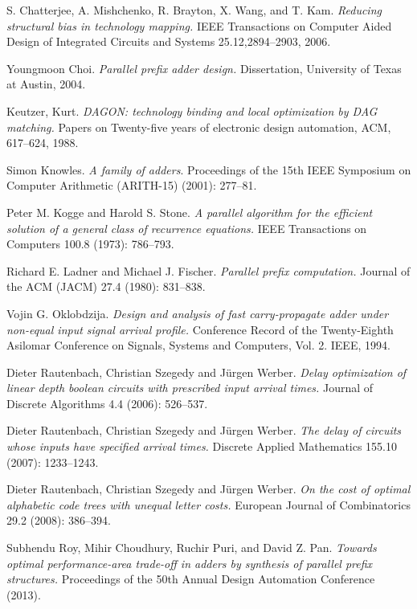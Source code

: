 \documentclass[11pt,final,microtype]{scrartcl}
\theoremstyle{plain}
\theoremstyle{definition}
\theoremstyle{remark}
\begin{document}
\begin{thebibliography}{10} 

S. Chatterjee, A. Mishchenko, R. Brayton, X. Wang, and T. Kam.
\emph{Reducing structural bias in technology mapping.}
IEEE Transactions on Computer Aided Design of Integrated Circuits and Systems 25.12,2894--2903, 2006.


 Youngmoon Choi. 
  \emph{Parallel prefix adder design.} Dissertation, University of Texas at Austin, 2004.

Keutzer, Kurt. 
\emph{DAGON: technology binding and local optimization by DAG matching.} 
Papers on Twenty-five years of electronic design automation, ACM, 617--624, 1988.


 Simon Knowles.
\emph{A family of adders}.
 Proceedings of the 15th IEEE Symposium on Computer Arithmetic (ARITH-15) (2001): 277--81.

Peter M. Kogge and Harold S. Stone. \emph{A parallel algorithm for the efficient solution of a
    general class of recurrence equations.}  IEEE
  Transactions on Computers 100.8 (1973): 786--793.

Richard E. Ladner and Michael  J. Fischer. \emph{Parallel prefix computation.} Journal of the ACM
  (JACM) 27.4 (1980): 831--838.


 Vojin G. Oklobdzija. \emph{Design and analysis of
fast carry-propagate adder under non-equal input signal arrival
profile.} Conference Record of the Twenty-Eighth Asilomar Conference
on Signals, Systems and Computers, Vol. 2. IEEE, 1994.

 Dieter Rautenbach, Christian Szegedy and J\"urgen
  Werber. \emph{Delay optimization of linear depth boolean circuits
    with prescribed input arrival times.} Journal of Discrete
  Algorithms 4.4 (2006): 526--537.

 Dieter Rautenbach, Christian Szegedy and J\"urgen
  Werber. \emph{The delay of circuits whose inputs have specified
    arrival times.} Discrete Applied Mathematics 155.10 (2007):
  1233--1243.

 Dieter Rautenbach, Christian Szegedy and
  J\"urgen Werber. \emph{On the cost of optimal alphabetic code trees
  with unequal letter costs.} European Journal of Combinatorics 29.2
  (2008): 386--394.

 Subhendu Roy, Mihir Choudhury, Ruchir Puri, and David
Z. Pan.
\emph{Towards optimal performance-area trade-off in adders by
synthesis of parallel prefix structures.} Proceedings of the 50th
Annual Design Automation Conference (2013).


\end{thebibliography}
\end{document}
